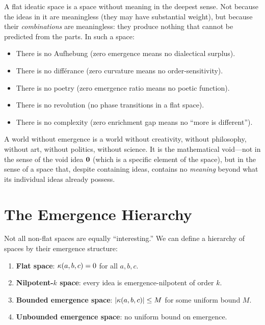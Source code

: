 \begin{interpretation}
A flat ideatic space is a space without meaning in the deepest sense. Not because
the ideas in it are meaningless (they may have substantial weight), but because
their \emph{combinations} are meaningless: they produce nothing that cannot be
predicted from the parts. In such a space:

\begin{itemize}
  \item There is no Aufhebung (zero emergence means no dialectical surplus).
  \item There is no diff\'erance (zero curvature means no order-sensitivity).
  \item There is no poetry (zero emergence ratio means no poetic function).
  \item There is no revolution (no phase transitions in a flat space).
  \item There is no complexity (zero enrichment gap means no ``more is different'').
\end{itemize}

A world without emergence is a world without creativity, without philosophy,
without art, without politics, without science. It is the mathematical void---not
in the sense of the void idea $\mathbf{0}$ (which is a specific element of the space),
but in the sense of a space that, despite containing ideas, contains no
\emph{meaning} beyond what its individual ideas already possess.
\end{interpretation}


\section{The Emergence Hierarchy}

Not all non-flat spaces are equally ``interesting.'' We can define a hierarchy
of spaces by their emergence structure:

\begin{definition}
\label{def:emergence-hierarchy}
\begin{enumerate}
  \item \textbf{Flat space}: $\kappa(a,b,c) = 0$ for all $a,b,c$.
  \item \textbf{Nilpotent-$k$ space}: every idea is emergence-nilpotent of order $k$.
  \item \textbf{Bounded emergence space}: $|\kappa(a,b,c)| \leq M$ for some
    uniform bound $M$.
  \item \textbf{Unbounded emergence space}: no uniform bound on emergence.
\end{enumerate}
\end{definition}

